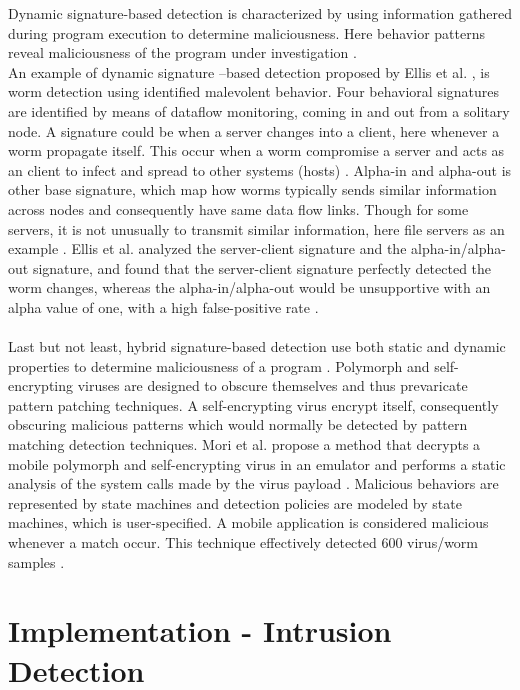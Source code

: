 \documentclass[12pt]{article} %
\begin{document}
Dynamic signature-based detection is characterized by using information gathered during program execution to determine maliciousness. Here behavior patterns reveal maliciousness of the program under investigation \cite{idika2007survey}. \\
An example of dynamic signature –based detection proposed by Ellis et al. \cite{idika2007survey}, is worm detection using identified malevolent behavior. Four behavioral signatures are identified by means of dataflow monitoring, coming in and out from a solitary node. A signature could be when a server changes into a client, here whenever a worm propagate itself. This occur when a worm compromise a server and acts as an client to infect and spread to other systems (hosts) \cite{idika2007survey}. Alpha-in and alpha-out is other base signature, which map how worms typically sends similar information across nodes and consequently have same data flow links. Though for some servers, it is not unusually to transmit similar information, here file servers as an example \cite{idika2007survey}. Ellis et al. \cite{idika2007survey} analyzed the server-client signature and the alpha-in/alpha-out signature, and found that the server-client signature perfectly detected the worm changes, whereas the alpha-in/alpha-out would be unsupportive with an alpha value of one, with a high false-positive rate \cite{idika2007survey}. \\ \\
Last but not least, hybrid signature-based detection use both static and dynamic properties to determine maliciousness of a program \cite{idika2007survey}. Polymorph and self-encrypting viruses are designed to obscure themselves and thus prevaricate pattern patching techniques. A self-encrypting virus encrypt itself, consequently obscuring malicious patterns which would normally be detected by pattern matching detection techniques. Mori et al. \cite{idika2007survey} propose a method that decrypts a mobile polymorph and self-encrypting virus in an emulator and performs a static analysis of the system calls made by the virus payload \cite{idika2007survey}. Malicious behaviors are represented by state machines and detection policies are modeled by state machines, which is user-specified. A mobile application is considered malicious whenever a match occur. This technique effectively detected 600 virus/worm samples \cite{idika2007survey}.
\section{Implementation - Intrusion Detection}
\end{document}
